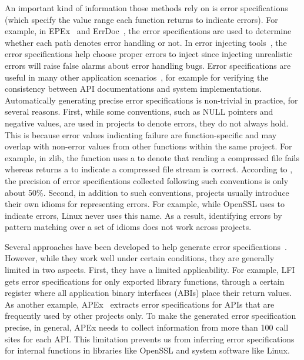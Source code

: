 \documentclass[12pt]{report}	%
\begin{document}
An important kind of information those methods rely on is
error specifications (which specify the value range each function
returns to indicate errors).
%
For example, in EPEx~\cite{jana2016automatically} and
ErrDoc~\cite{Tian:2017:ADR}, 
the error specifications are used to
determine whether each path denotes error handling or not.
%
In error injecting tools~\cite{marinescu2011efficient}, the error specifications help choose proper errors to inject 
since injecting unrealistic errors will raise false alarms about 
error handling bugs.
%
Error specifications are useful in many other application scenarios~\cite{myers2016improving,weimer2005mining,rubio2010expect,cheon2007automated},
for example for 
verifying the consistency between API documentations and system implementations.
%
Automatically generating precise error specifications 
is non-trivial in practice, for several reasons.
%
First, 
while some conventions, such as
NULL pointers and negative values, are used in projects to denote errors,
they do not always hold.
This is because error values indicating failure are function-specific and 
may overlap with non-error values from other functions within
the same project. 
For example, in zlib, the function
 uses a
 to denote that reading a compressed file fails
whereas 
returns a  to indicate a compressed file stream is correct.
%
According to \cite{Kang:2016:AAI:2970276.2970354}, 
the precision
of error specifications collected following such 
conventions is only about 50\%. 
%
Second, in addition to such conventions, 
projects usually introduce their own idioms for representing errors.
%
For example, while OpenSSL uses  to indicate errors,
Linux never uses this name.
As a result, identifying errors by pattern matching over a set of idioms does not work across projects.

Several approaches have been developed to 
help generate error specifications~\cite{marinescu2011efficient,Kang:2016:AAI:2970276.2970354,Acharya:2009:MAE}. 
%
However, while they work well under certain conditions, they 
are generally limited in two aspects. 
%
First, they have a limited applicability. For example, 
LFI~\cite{marinescu2011efficient} gets error specifications for only exported library functions,
through a certain register
where all application binary interfaces (ABIs) place their return values.
%
As another example, 
APEx~\cite{Kang:2016:AAI:2970276.2970354} extracts
error specifications for APIs that are frequently used by other projects only. 
%
To make the generated error specification precise,
in general, APEx needs to collect information from more than 100 call sites for each API.
%
This limitation prevents us from inferring error specifications for internal functions in libraries 
like OpenSSL and system software like Linux.
\end{document}
